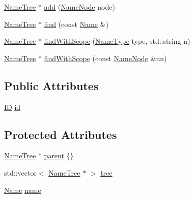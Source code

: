 \begin{DoxyCompactItemize}
\item 
\mbox{\hyperlink{class_erable_1_1_compiler_1_1_a_s_t_1_1_name_tree}{Name\+Tree}} $\ast$ \mbox{\hyperlink{class_erable_1_1_compiler_1_1_a_s_t_1_1_name_tree_a4f0ed8167457bda92a2d1110a9f906f8}{add}} (\mbox{\hyperlink{struct_erable_1_1_compiler_1_1_a_s_t_1_1_name_node}{Name\+Node}} node)
\item 
\mbox{\hyperlink{class_erable_1_1_compiler_1_1_a_s_t_1_1_name_tree}{Name\+Tree}} $\ast$ \mbox{\hyperlink{class_erable_1_1_compiler_1_1_a_s_t_1_1_name_tree_aa323751cb75911639abda147973a0251}{find}} (const \mbox{\hyperlink{class_erable_1_1_compiler_1_1_a_s_t_1_1_name}{Name}} \&)
\item 
\mbox{\hyperlink{class_erable_1_1_compiler_1_1_a_s_t_1_1_name_tree}{Name\+Tree}} $\ast$ \mbox{\hyperlink{class_erable_1_1_compiler_1_1_a_s_t_1_1_name_tree_a5d416974eecfacdfb10710cd47b454c8}{find\+With\+Scope}} (\mbox{\hyperlink{namespace_erable_1_1_compiler_1_1_a_s_t_a9359137137aacfee07e935a0ae706a84}{Name\+Type}} type, std\+::string n)
\item 
\mbox{\hyperlink{class_erable_1_1_compiler_1_1_a_s_t_1_1_name_tree}{Name\+Tree}} $\ast$ \mbox{\hyperlink{class_erable_1_1_compiler_1_1_a_s_t_1_1_name_tree_aef30f0eaa9729e73e5b91103794060c8}{find\+With\+Scope}} (const \mbox{\hyperlink{struct_erable_1_1_compiler_1_1_a_s_t_1_1_name_node}{Name\+Node}} \&nn)
\end{DoxyCompactItemize}
\subsection*{Public Attributes}
\begin{DoxyCompactItemize}
\item 
\mbox{\hyperlink{struct_erable_1_1_compiler_1_1_a_s_t_1_1_i_d}{ID}} \mbox{\hyperlink{class_erable_1_1_compiler_1_1_a_s_t_1_1_name_tree_a98973b6fb17ebf1fffe70ad0d1938640}{id}}
\end{DoxyCompactItemize}
\subsection*{Protected Attributes}
\begin{DoxyCompactItemize}
\item 
\mbox{\hyperlink{class_erable_1_1_compiler_1_1_a_s_t_1_1_name_tree}{Name\+Tree}} $\ast$ \mbox{\hyperlink{class_erable_1_1_compiler_1_1_a_s_t_1_1_name_tree_a9f06bae060fbc5d1caf3ff5217efe1d7}{parent}} \{\}
\item 
std\+::vector$<$ \mbox{\hyperlink{class_erable_1_1_compiler_1_1_a_s_t_1_1_name_tree}{Name\+Tree}} $\ast$ $>$ \mbox{\hyperlink{class_erable_1_1_compiler_1_1_a_s_t_1_1_name_tree_aa5535b40b2cac012da11e76e99450959}{tree}}
\item 
\mbox{\hyperlink{class_erable_1_1_compiler_1_1_a_s_t_1_1_name}{Name}} \mbox{\hyperlink{class_erable_1_1_compiler_1_1_a_s_t_1_1_name_tree_aff22e85f6bc0c00445af8dd19d851688}{name}}
\end{DoxyCompactItemize}


